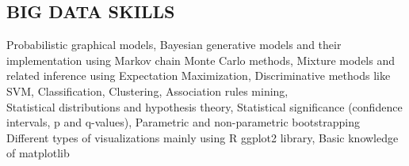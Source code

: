 \documentclass[margin, 10pt]{res} %
\begin{document}
\begin{resume}
\section{BIG DATA SKILLS}
{\bf \color{Brown}{Machine Learning Skills:}} 
Probabilistic graphical models, Bayesian generative models and their implementation using Markov chain Monte Carlo methods, Mixture models and related inference using Expectation Maximization, Discriminative methods like SVM, Classification, Clustering, Association rules mining,   \\
{\bf \color{Brown}{Statistical Theory:}} Statistical distributions and hypothesis theory, Statistical significance (confidence intervals, p and q-values), Parametric and non-parametric bootstrapping \\
{\bf \color{Brown}{Statistical Visualization and reporting:}} Different types of visualizations mainly using R ggplot2 library, Basic knowledge of matplotlib 



\end{resume}
\end{document}
